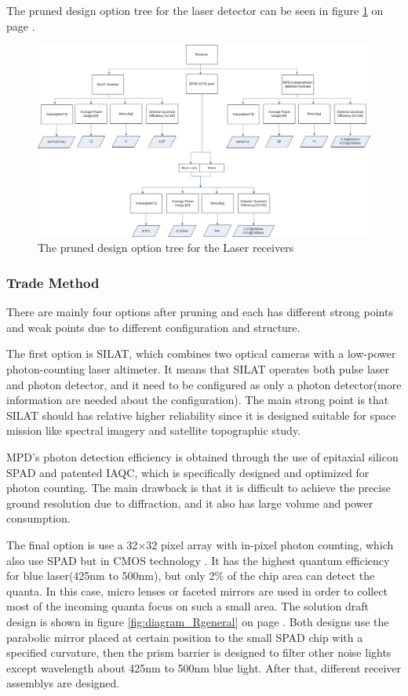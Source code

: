 The pruned design option tree for the laser detector can be seen in figure \ref{fig:PrunedReceiver} on page \pageref{fig:PrunedReceiver}.

\begin{figure}[ht!]
\centering
\includegraphics[scale=0.7, angle=90]{chapters/img/DOTreceiverPruned.jpg}
\caption{The pruned design option tree for the Laser receivers}
\label{fig:PrunedReceiver}
\end{figure}

\subsubsection{Trade Method}
\label{TOReceiverM}
There are mainly four options after pruning and each has different strong points and weak points due to different configuration and structure. 

The first option is \ac{SILAT}, which combines two optical cameras with a low-power photon-counting laser altimeter. It means that \acs{SILAT} operates both pulse laser and photon detector, and it need to be configured as only a photon detector(more information are needed about the configuration). The main strong point is that \acs{SILAT} should has relative higher reliability since it is designed suitable for space mission like spectral imagery and satellite topographic study. 

\ac{MPD}'s photon detection efficiency is obtained through the use of epitaxial silicon \ac{SPAD} and patented \ac{IAQC}, which is specifically designed and optimized for photon counting. The main drawback is that it is difficult to achieve the precise ground resolution due to diffraction, and it also has large volume and power consumption.

The final option is use a 32$\times$32 pixel array with in-pixel photon counting, which also use \acs{SPAD} but in \ac{CMOS} technology \cite{SPAD}. It has the highest quantum efficiency for blue laser(425nm to 500nm), but only 2\% of the chip area can detect the quanta. In this case, micro lenses or faceted mirrors are used in order to collect most of the incoming quanta focus on such a small area. The solution draft design is shown in figure \ref{fig:diagram_Rgeneral} on page \pageref{fig:diagram_Rgeneral}. Both designs use the parabolic mirror placed at certain position to the small \acs{SPAD} chip with a specified curvature, then the prism barrier is designed to filter other noise lights except wavelength about 425nm to 500nm blue light. After that, different receiver assemblys are designed.

